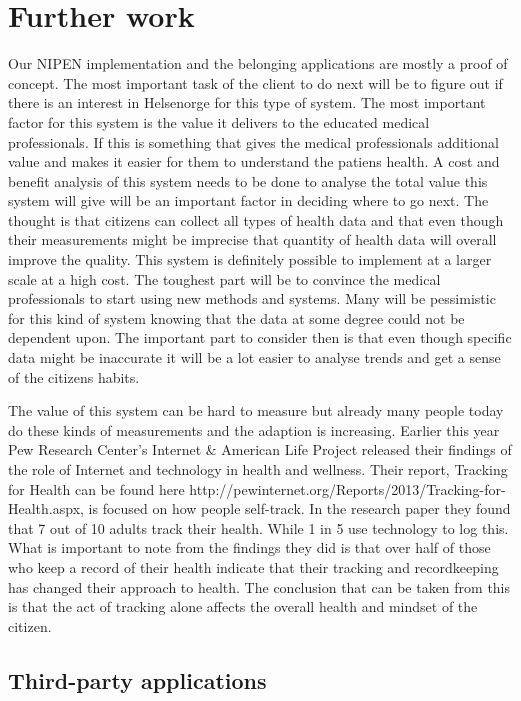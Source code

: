 \section{Further work}

Our NIPEN implementation and the belonging applications are mostly a proof of concept. 
The most important task of the client to do next will be to figure out if there is an interest in Helsenorge for this type of system.
The most important factor for this system is the value it delivers to the educated medical professionals. 
If this is something that gives the medical professionals additional value and makes it easier for them to understand the patiens health. 
A cost and benefit analysis of this system needs to be done to analyse the total value this system will give will be an important factor in deciding where to go next. 
The thought is that citizens can collect all types of health data and that even though their measurements might be imprecise that quantity of health data will overall improve the quality. 
This system is definitely possible to implement at a larger scale at a high cost.
The toughest part will be to convince the medical professionals to start using new methods and systems. 
Many will be pessimistic for this kind of system knowing that the data at some degree could not be dependent upon.
The important part to consider then is that even though specific data might be inaccurate it will be a lot easier to analyse trends and get a sense of the citizens habits. 

The value of this system can be hard to measure but already many people today do these kinds of measurements and the adaption is increasing. 
Earlier this year Pew Research Center’s Internet \& American Life Project released their findings of the role of Internet and technology in health and wellness. 
Their report, Tracking for Health can be found here http://pewinternet.org/Reports/2013/Tracking-for-Health.aspx, is focused on how people self-track.
In the research paper they found that 7 out of 10 adults track their health.
While 1 in 5 use technology to log this. 
What is important to note from the findings they did is that over half of those who keep a record of their health indicate that their tracking and recordkeeping has changed their approach to health.
The conclusion that can be taken from this is that the act of tracking alone affects the overall health and mindset of the citizen. 

\subsection{Third-party applications}

